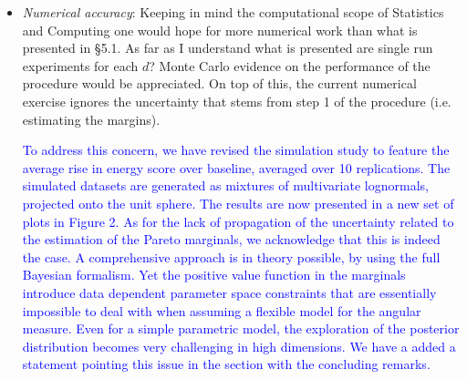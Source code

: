 \documentclass[10pt]{article}
\newcommand{\comment}[1]{\textcolor{teal}{#1}}
\newcommand{\bruno}[1]{\textcolor{red}{#1}}
\newcommand{\response}[1]{\textcolor{blue}{#1}}
\begin{document}
\begin{itemize}

    

\item \emph{Numerical accuracy}:  Keeping in mind the computational scope of 
    Statistics and Computing one would hope for more numerical work than what is 
    presented in §5.1. As far as I understand what is presented are single run 
    experiments for each $d$? Monte Carlo evidence on the performance of the 
    procedure would be appreciated. On top of this, the current numerical exercise
    ignores the uncertainty that stems from step 1 of the procedure 
    (i.e. estimating the margins).

\response{To address this concern, we have revised the simulation study to feature the 
    average rise in energy score over baseline, averaged over 10 replications.  
    The simulated datasets are generated as mixtures of multivariate lognormals, 
    projected onto the unit sphere.  The results are now presented in a new set
    of plots in Figure 2. As for the lack of propagation of the uncertainty
    related to the estimation of the Pareto marginals, we acknowledge that this is
    indeed the case. A comprehensive approach is in theory possible, by using the
    full Bayesian formalism. Yet the positive value function in the marginals 
    introduce data dependent parameter space constraints that are essentially
    impossible to deal with when assuming a flexible model for the angular
    measure. Even for a simple parametric model, the exploration of the posterior
    distribution becomes very challenging in high dimensions. We have a added
    a statement pointing this issue in the section with the concluding remarks.
    }


\end{itemize}
\end{document}
